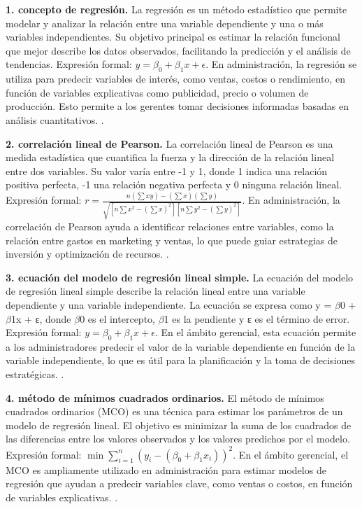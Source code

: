 {\textbf{1. concepto de regresión.} La regresión es un método estadístico que permite modelar y analizar la relación entre una variable dependiente y una o más variables independientes. Su objetivo principal es estimar la relación funcional que mejor describe los datos observados, facilitando la predicción y el análisis de tendencias. Expresión formal: $y = \beta_0 + \beta_1x + \epsilon$. En administración, la regresión se utiliza para predecir variables de interés, como ventas, costos o rendimiento, en función de variables explicativas como publicidad, precio o volumen de producción. Esto permite a los gerentes tomar decisiones informadas basadas en análisis cuantitativos. \citep{anderson2012,lind2012,wackerly2010}.

\textbf{2. correlación lineal de Pearson.} La correlación lineal de Pearson es una medida estadística que cuantifica la fuerza y la dirección de la relación lineal entre dos variables. Su valor varía entre -1 y 1, donde 1 indica una relación positiva perfecta, -1 una relación negativa perfecta y 0 ninguna relación lineal. Expresión formal: $r = \frac{n(\sum xy) - (\sum x)(\sum y)}{\sqrt{[n\sum x^2 - (\sum x)^2][n\sum y^2 - (\sum y)^2]}}$. En administración, la correlación de Pearson ayuda a identificar relaciones entre variables, como la relación entre gastos en marketing y ventas, lo que puede guiar estrategias de inversión y optimización de recursos. \citep{anderson2012,lind2012,wackerly2010}.

\textbf{3. ecuación del modelo de regresión lineal simple.} La ecuación del modelo de regresión lineal simple describe la relación lineal entre una variable dependiente y una variable independiente. La ecuación se expresa como y = $\beta$0 + $\beta$1x + ε, donde $\beta$0 es el intercepto, $\beta$1 es la pendiente y ε es el término de error. Expresión formal: $y = \beta_0 + \beta_1x + \epsilon$. En el ámbito gerencial, esta ecuación permite a los administradores predecir el valor de la variable dependiente en función de la variable independiente, lo que es útil para la planificación y la toma de decisiones estratégicas. \citep{anderson2012,lind2012,wackerly2010}.

\textbf{4. método de mínimos cuadrados ordinarios.} El método de mínimos cuadrados ordinarios (MCO) es una técnica para estimar los parámetros de un modelo de regresión lineal. El objetivo es minimizar la suma de los cuadrados de las diferencias entre los valores observados y los valores predichos por el modelo. Expresión formal: $\min \sum_{i=1}^{n} (y_i - (\beta_0 + \beta_1x_i))^2$. En el ámbito gerencial, el MCO es ampliamente utilizado en administración para estimar modelos de regresión que ayudan a predecir variables clave, como ventas o costos, en función de variables explicativas. \citep{anderson2012,lind2012,wackerly2010}.

}
